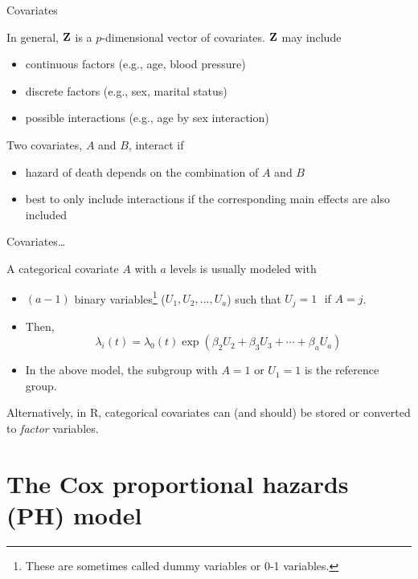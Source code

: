 \documentclass[ignorenonframetext,]{beamer}
\begin{document}
\begin{frame}{%
\protect\hypertarget{covariates}{%
Covariates}}

In general, \({\bf Z}\) is a \(p\)-dimensional vector of covariates.
\({\bf Z}\) may include

\begin{itemize}
\item
  continuous factors (e.g., age, blood pressure)
\item
  discrete factors (e.g., sex, marital status)
\item
  possible interactions (e.g., age by sex interaction)
\end{itemize}

Two covariates, \(A\) and \(B\), interact if

\begin{itemize}
\item
  hazard of death depends on the combination of \(A\) and \(B\)
\item
  best to only include interactions if the corresponding main effects
  are also included
\end{itemize}

\end{frame}

\begin{frame}{%
\protect\hypertarget{covariates-1}{%
Covariates\ldots}}

A categorical covariate \(A\) with \(a\) levels is usually modeled with

\begin{itemize}
\item
  \((a-1)\) binary
  variables\footnote{These are sometimes called dummy variables or 0-1 variables.}
  (\(U_1,U_2,\ldots,U_a\)) such that \(U_j=1 \, \, \mbox{ if } A=j\).
\item
  Then,
  \[\lambda_i(t)=\lambda_0(t)\exp(\beta_2 U_2+\beta_3 U_3+\cdots+\beta_a U_a)\]
\item
  In the above model, the subgroup with \(A=1\) or \(U_1=1\) is the
  reference group.
\end{itemize}

Alternatively, in \textsf{R}, categorical covariates can (and should) be
stored or converted to \emph{factor} variables.

\end{frame}

\hypertarget{the-cox-proportional-hazards-ph-model}{%
\section{The Cox proportional hazards (PH)
model}\label{the-cox-proportional-hazards-ph-model}}
\end{document}
